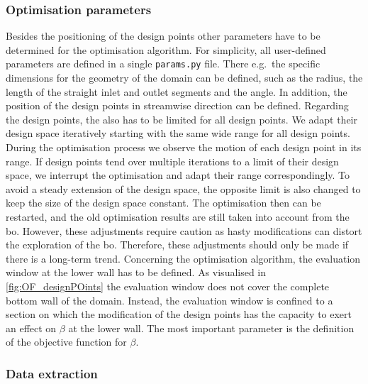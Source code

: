 \newpage
\subsubsection{Optimisation parameters}

Besides the positioning of the design points other parameters have to be determined for the optimisation algorithm.
For simplicity, all user-defined parameters are defined in a single \texttt{params.py} file.
There e.g.~the specific dimensions for the geometry of the domain can be defined, such as the radius, the length of the straight inlet and outlet segments and the angle.
In addition, the position of the design points in streamwise direction can be defined.
Regarding the design points, the  also has to be limited for all design points.
We adapt their design space iteratively starting with the same wide range for all design points.
During the optimisation process we observe the motion of each design point in its range.
If design points tend over multiple iterations to a limit of their design space, we interrupt the optimisation and adapt their range correspondingly.
To avoid a steady extension of the design space, the opposite limit is also changed to keep the size of the design space constant.
The optimisation then can be restarted, and the old optimisation results are still taken into account from the \acrshort{bo}.
However, these adjustments require caution as hasty modifications can distort the exploration of the \acrshort{bo}.
Therefore, these adjustments should only be made if there is a long-term trend.
Concerning the optimisation algorithm, the evaluation window at the lower wall has to be defined.
As visualised in \autoref{fig:OF_designPOints} the evaluation window does not cover the complete bottom wall of the domain.
Instead, the evaluation window is confined to a section on which the modification of the design points has the capacity to exert an effect on $\beta$ at the lower wall.
The most important parameter is the definition of the objective function for $\beta$.


\subsubsection{Data extraction} \label{subsec:data_extr}

